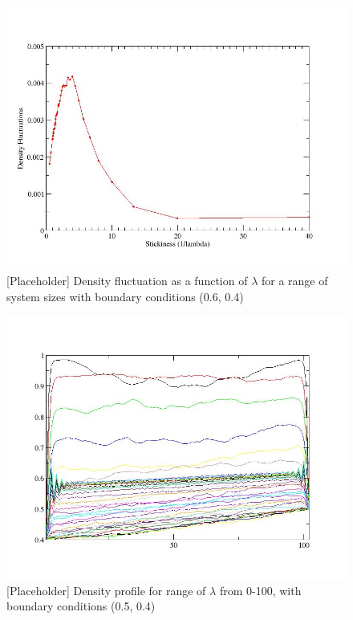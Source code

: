 \documentclass[
reprint, amsmath,amssymb,
]{revtex4-1}
\begin{document}
\begin{figure}[h!]
\vspace{1em}
\begin{center}
    \includegraphics[width=0.5\linewidth]{densityFluct.jpg}
\end{center}
    \vspace{-0em}
\caption{\label{fig:DenFluc} [Placeholder] Density fluctuation 
as a function of $\lambda$
 for a  range of system sizes 
 with boundary conditions
  (0.6, 0.4) }
\end{figure}

\begin{figure}[h!]
\vspace{1em}
\begin{center}
    \includegraphics[width=0.5\linewidth]{profile.jpg}
\end{center}
    \vspace{-0em}
\caption{\label{fig:DenProfile} [Placeholder] Density profile for
  range of $\lambda$ from 0-100, with boundary conditions (0.5, 0.4) }
\end{figure}
\end{document}
